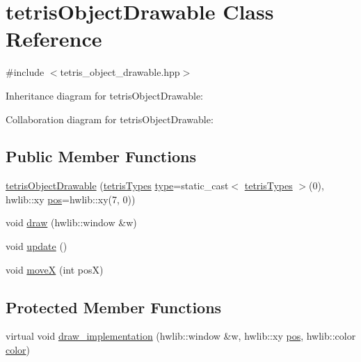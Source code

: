 \hypertarget{classtetrisObjectDrawable}{}\section{tetris\+Object\+Drawable Class Reference}
\label{classtetrisObjectDrawable}


{\ttfamily \#include $<$tetris\+\_\+object\+\_\+drawable.\+hpp$>$}



Inheritance diagram for tetris\+Object\+Drawable\+:


Collaboration diagram for tetris\+Object\+Drawable\+:
\subsection*{Public Member Functions}
\begin{DoxyCompactItemize}
\item 
\hyperlink{classtetrisObjectDrawable_a88661f3ddd7ec7330c4867f545f54780}{tetris\+Object\+Drawable} (\hyperlink{enums_8hpp_aa2b983d3f5fee7f17796e5ef5040d787}{tetris\+Types} \hyperlink{classtetrisObjectDrawable_a0166b001667649c81bc968b4094ee557}{type}=static\+\_\+cast$<$ \hyperlink{enums_8hpp_aa2b983d3f5fee7f17796e5ef5040d787}{tetris\+Types} $>$(0), hwlib\+::xy \hyperlink{classtetrisObjectDrawable_a53668abad09e9ec1cfca2b455cbe44f1}{pos}=hwlib\+::xy(7, 0))
\item 
void \hyperlink{classtetrisObjectDrawable_a8a8d34133c0b548220e956f1a2a7ebb0}{draw} (hwlib\+::window \&w)
\item 
void \hyperlink{classtetrisObjectDrawable_a3c8d207623221bd17246d51c13dc3eb4}{update} ()
\item 
void \hyperlink{classtetrisObjectDrawable_aea57aae17625b6be7efee46b85d41b9f}{moveX} (int posX)
\end{DoxyCompactItemize}
\subsection*{Protected Member Functions}
\begin{DoxyCompactItemize}
\item 
virtual void \hyperlink{classtetrisObjectDrawable_ae9668f6c46bcffbe62897387cd8a7989}{draw\+\_\+implementation} (hwlib\+::window \&w, hwlib\+::xy \hyperlink{classtetrisObjectDrawable_a53668abad09e9ec1cfca2b455cbe44f1}{pos}, hwlib\+::color \hyperlink{classtetrisObjectDrawable_a1093d07485e1cae9c91bd52cb423ccd1}{color})
\end{DoxyCompactItemize}
